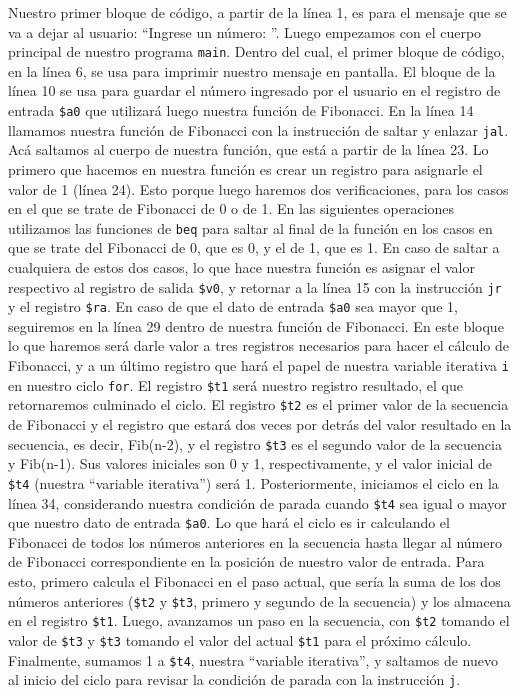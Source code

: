 \documentclass{article}
\begin{document}
Nuestro primer bloque de código, a partir de la línea 1, es para el mensaje que se va a dejar al usuario: ``Ingrese un número: ''.
Luego empezamos con el cuerpo principal de nuestro programa \texttt{main}. Dentro del cual, el primer bloque de código, en la línea 6, se usa para imprimir nuestro mensaje en pantalla.
El bloque de la línea 10 se usa para guardar el número ingresado por el usuario en el registro de entrada \texttt{\$a0} que utilizará luego nuestra función de Fibonacci.
En la línea 14 llamamos nuestra función de Fibonacci con la instrucción de saltar y enlazar \texttt{jal}. Acá saltamos al cuerpo de nuestra función, que está a partir de la línea 23.
Lo primero que hacemos en nuestra función es crear un registro para asignarle el valor de 1 (línea 24). Esto porque luego haremos dos verificaciones, para los casos en el que se trate de Fibonacci de 0 o de 1.
En las siguientes operaciones utilizamos las funciones de \texttt{beq} para saltar al final de la función en los casos en que se trate del Fibonacci de 0, que es 0, y el de 1, que es 1. En caso de saltar a cualquiera de estos dos casos, lo que hace nuestra función es asignar el valor respectivo al registro de salida \texttt{\$v0}, y retornar a la línea 15 con la instrucción \texttt{jr} y el registro \texttt{\$ra}.
En caso de que el dato de entrada \texttt{\$a0} sea mayor que 1, seguiremos en la línea 29 dentro de nuestra función de Fibonacci. En este bloque lo que haremos será darle valor a tres registros necesarios para hacer el cálculo de Fibonacci, y a un último registro que hará el papel de nuestra variable iterativa \texttt{i} en nuestro ciclo \texttt{for}. El registro \texttt{\$t1} será nuestro registro resultado, el que retornaremos culminado el ciclo. El registro \texttt{\$t2} es el primer valor de la secuencia de Fibonacci y el registro que estará dos veces por detrás del valor resultado en la secuencia, es decir, Fib(n-2), y el registro \texttt{\$t3} es el segundo valor de la secuencia y Fib(n-1). Sus valores iniciales son 0 y 1, respectivamente, y el valor inicial de \texttt{\$t4} (nuestra ``variable iterativa'') será 1.
Posteriormente, iniciamos el ciclo en la línea 34, considerando nuestra condición de parada cuando \texttt{\$t4} sea igual o mayor que nuestro dato de entrada \texttt{\$a0}.
Lo que hará el ciclo es ir calculando el Fibonacci de todos los números anteriores en la secuencia hasta llegar al número de Fibonacci correspondiente en la posición de nuestro valor de entrada. Para esto, primero calcula el Fibonacci en el paso actual, que sería la suma de los dos números anteriores (\texttt{\$t2} y \texttt{\$t3}, primero y segundo de la secuencia) y los almacena en el registro \texttt{\$t1}. Luego, avanzamos un paso en la secuencia, con \texttt{\$t2} tomando el valor de \texttt{\$t3} y \texttt{\$t3} tomando el valor del actual \texttt{\$t1} para el próximo cálculo. Finalmente, sumamos 1 a \texttt{\$t4}, nuestra ``variable iterativa'', y saltamos de nuevo al inicio del ciclo para revisar la condición de parada con la instrucción \texttt{j}.
\end{document}
